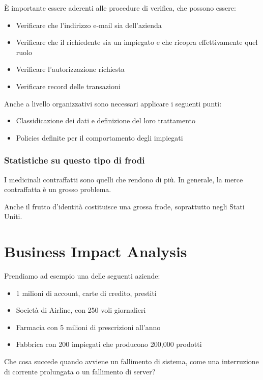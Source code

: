 È importante essere aderenti alle procedure di verifica, che possono essere:
\begin{itemize}
  \item Verificare che l'indirizzo e-mail sia dell'azienda
  \item Verificare che il richiedente sia un impiegato e che ricopra 
  effettivamente quel ruolo
  \item Verificare l'autorizzazione richiesta
  \item Verificare record delle transazioni
\end{itemize}

Anche a livello organizzativi sono necessari applicare i seguenti punti:
\begin{itemize}
  \item Classidicazione dei dati e definizione del loro trattamento
  \item Policies definite per il comportamento degli impiegati
\end{itemize}

\subsection{Statistiche su questo tipo di frodi}

I medicinali contraffatti sono quelli che rendono di più. In generale, la merce 
contraffatta è un grosso problema.

Anche il frutto d'identità costituisce una grossa frode, soprattutto negli 
Stati Uniti.


\chapter{Business Impact Analysis}

Prendiamo ad esempio una delle seguenti aziende:
\begin{itemize}
  \item 1 milioni di account, carte di credito, prestiti
  \item Società di Airline, con 250 voli giornalieri
  \item Farmacia con 5 milioni di prescrizioni all'anno
  \item Fabbrica con 200 impiegati che producono 200,000 prodotti
\end{itemize}

Che cosa succede quando avviene un fallimento di sistema, come una interruzione 
di corrente prolungata o un fallimento di server?

